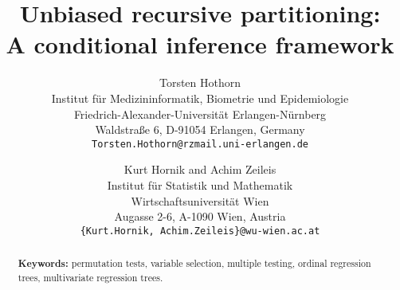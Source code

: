 \documentclass[12pt]{article}
\title{Unbiased recursive partitioning: \\ A conditional inference framework}
\author{Torsten Hothorn \\
        Institut f\"ur Medizininformatik, Biometrie und Epidemiologie\\
        Friedrich-Alexander-Universit\"at Erlangen-N\"urnberg\\
        Waldstra{\ss}e 6, D-91054 Erlangen, Germany \\
        \texttt{Torsten.Hothorn@rzmail.uni-erlangen.de}
 \and   Kurt Hornik and Achim Zeileis\\
        Institut f\"ur Statistik und Mathematik \\ 
        Wirtschaftsuniversit\"at Wien \\
        Augasse 2-6, A-1090 Wien, Austria \\  
        \texttt{\{Kurt.Hornik, Achim.Zeileis\}@wu-wien.ac.at}}
\date{}
\begin{document}
\maketitle

\thispagestyle{empty}

\begin{abstract}

\par\vspace*{0.5cm}
\noindent
{\bf Keywords:} permutation tests, variable selection, multiple testing,
                ordinal regression trees, multivariate regression trees.
\end{abstract}
















\end{document}
